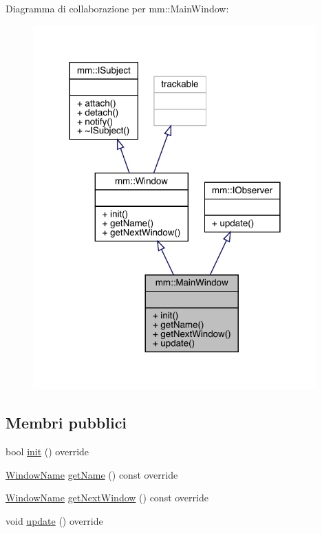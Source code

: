 Diagramma di collaborazione per mm\+:\+:Main\+Window\+:\nopagebreak
\begin{figure}[H]
\begin{center}
\leavevmode
\includegraphics[width=309pt]{df/d8f/classmm_1_1_main_window__coll__graph}
\end{center}
\end{figure}
\subsection*{Membri pubblici}
\begin{DoxyCompactItemize}
\item 
bool \hyperlink{classmm_1_1_main_window_a1094273a8ac991a50e4612efa8174fdd}{init} () override
\item 
\hyperlink{namespacemm_a4e9d92e04f65dbf2fc1963947da0d93c}{Window\+Name} \hyperlink{classmm_1_1_main_window_a8cfdfeb6ad47afff06fa6b1b7fdc0c88}{get\+Name} () const override
\item 
\hyperlink{namespacemm_a4e9d92e04f65dbf2fc1963947da0d93c}{Window\+Name} \hyperlink{classmm_1_1_main_window_aa1511ad7bed8d47cd35415d0a3a1161e}{get\+Next\+Window} () const override
\item 
void \hyperlink{classmm_1_1_main_window_ac0fc4875dc774c1b7b1ca59d174a7fc1}{update} () override
\end{DoxyCompactItemize}


